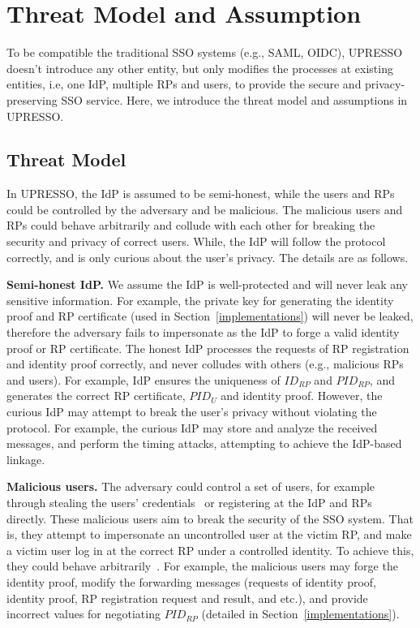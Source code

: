 \section{Threat Model and Assumption}
\label{sec:assumptionandthreatmodel}
To be compatible the traditional SSO systems (e.g., SAML, OIDC), UPRESSO doesn't introduce any other entity, but only
  modifies the processes at existing entities,  i.e, one IdP, multiple RPs and users, to provide the secure and privacy-preserving SSO service.
Here, we introduce the threat model and assumptions in UPRESSO. 


\subsection{Threat Model}
In UPRESSO, the IdP is assumed to be semi-honest, while the users and RPs could be controlled by the adversary and be malicious. %
The malicious users and RPs could behave arbitrarily and collude with each other for breaking the security and privacy of correct users.
While, the IdP will follow the protocol correctly, and is only curious about the user's privacy.
The details are as follows.

\vspace{1mm}\noindent \textbf{Semi-honest IdP.}
We assume the IdP is well-protected and will never leak any sensitive information.
For example, the private key for generating the identity proof and RP certificate (used in Section~\ref{implementations}) will never be leaked,
 therefore the adversary fails to impersonate as the IdP to forge a valid identity proof or RP certificate.
The honest IdP processes the requests of RP registration and identity proof correctly, 
and never colludes with others (e.g., malicious RPs and users).
For example, IdP ensures the uniqueness of $ID_{RP}$ and $PID_{RP}$, and generates the correct RP certificate, $PID_U$ and identity proof.
However, the curious IdP may attempt to break the user's privacy without violating the protocol.
For example, the curious IdP may store and analyze the received messages, and perform the timing attacks, attempting to achieve the IdP-based linkage. 


\vspace{1mm}\noindent \textbf{Malicious users.}
The adversary could control a set of users, for example through stealing the users' credentials~\cite{WangZWYH16, SunCL12} or registering  at the IdP and RPs directly.
These malicious users
 aim to break the security of the SSO system.
That is, they  attempt to impersonate  an uncontrolled user at the victim RP, and  make  a victim user log in at the correct RP under a controlled identity.
To achieve this, they could behave arbitrarily~\cite{WangCW12, SomorovskyMSKJ12}.
For example, the malicious users may forge the identity proof, modify the forwarding messages (requests of identity proof, identity proof,  RP registration request and result, and etc.), and provide incorrect values for negotiating $PID_{RP}$ (detailed in Section~\ref{implementations}).

